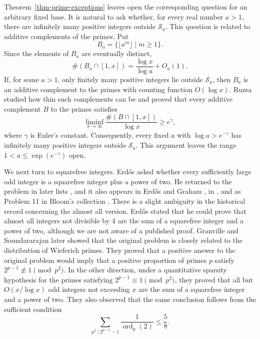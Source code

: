 \documentclass[11pt,reqno]{amsart}
\numberwithin{equation}{section}
\begin{document}
    Theorem~\ref{thm-prime-exceptions} leaves open the corresponding question for an arbitrary fixed base. It is natural to ask whether, for every real number $a>1$, there are infinitely many positive integers outside $\mathcal{S}_a$. This question is related to additive complements of the primes. Put
    \[
     B_a=\{\lfloor a^m\rfloor\mid m\ge1\}.
    \]
    Since the elements of $B_a$ are eventually distinct,
    \[
     \#(B_a\cap[1,x])=\frac{\log x}{\log a}+O_a(1).
    \]
    If, for some $a>1$, only finitely many positive integers lie outside $\mathcal{S}_a$, then $B_a$ is an additive complement to the primes with counting function $O(\log x)$. Ruzsa \cite[Theorem~2]{Ruzsa1998Primes} studied how thin such complements can be and proved that every additive complement $B$ to the primes satisfies
    \[
     \liminf_{x\to\infty}\frac{\#(B\cap[1,x])}{\log x}\ge e^\gamma,
    \]
    where $\gamma$ is Euler's constant. Consequently, every fixed $a$ with $\log a>e^{-\gamma}$ has infinitely many positive integers outside $\mathcal{S}_a$. This argument leaves the range $1<a\le \exp(e^{-\gamma})$ open.

    We next turn to squarefree integers. Erd\H{o}s \cite{Erdos1950} asked whether every sufficiently large odd integer is a squarefree integer plus a power of two. He returned to the problem in later lists \cite[p. 9]{Erdos1981}, and it also appears in Erd\H{o}s and Graham \cite[p. 28]{ErdosGraham}, in \cite{Erdos1997}, and as Problem 11 in Bloom's collection \cite{Bloom11}. There is a slight ambiguity in the historical record concerning the almost all version. Erd\H{o}s \cite{ErdosUnsolved1997} stated that he could prove that almost all integers not divisible by $4$ are the sum of a squarefree integer and a power of two, although we are not aware of a published proof. Granville and Soundararajan \cite{GranvilleSound} later showed that the original problem is closely related to the distribution of Wieferich primes. They proved that a positive answer to the original problem would imply that a positive proportion of primes $p$ satisfy $2^{p-1}\not\equiv1\pmod{p^2}$. In the other direction, under a quantitative sparsity hypothesis for the primes satisfying $2^{p-1}\equiv1\pmod{p^2}$, they proved that all but $O(x/\log x)$ odd integers not exceeding $x$ are the sum of a squarefree integer and a power of two. They also observed that the same conclusion follows from the sufficient condition
    $$
    \sum_{p^2\mid 2^{p-1}-1}\frac{1}{\operatorname{ord}_p(2)}\le\frac58.
    $$
\end{document}
